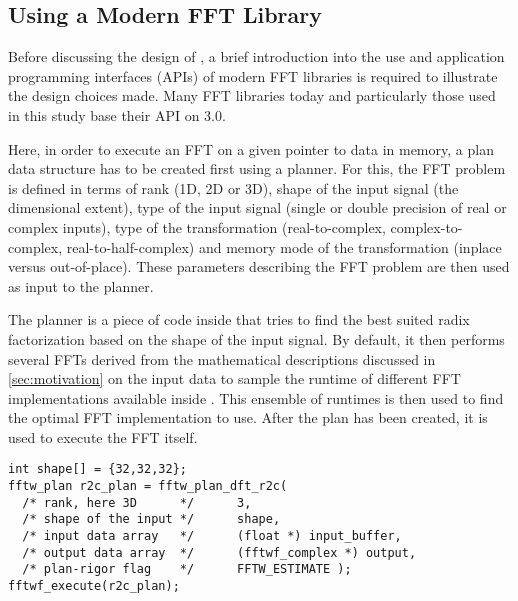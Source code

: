
\subsection{Using a Modern FFT Library}
\label{ssec:modern_ffts}
Before discussing the design of \gearshifft{}, a brief introduction into the use and application programming interfaces (APIs) of modern FFT libraries is required to illustrate the design choices made. Many FFT libraries today and particularly those used in this study base their API on \fftw{} $3.0$. 

Here, in order to execute an FFT on a given pointer to data in memory, a plan data structure has to be created first using a planner. For this, the FFT problem is defined in terms of rank (1D, 2D or 3D), shape of the input signal (the dimensional extent), type of the input signal (single or double precision of real or complex inputs), type of the transformation (real-to-complex, complex-to-complex, real-to-half-complex) and memory mode of the transformation (inplace versus out-of-place). These parameters describing the FFT problem are then used as input to the planner. 

The planner is a piece of code inside \fftw{} that tries to find the best suited radix factorization based on the shape of the input signal. By default, it then performs several FFTs derived from the mathematical descriptions discussed in \cref{sec:motivation} on the input data to sample the runtime of different FFT implementations available inside \fftw{}. This ensemble of runtimes is then used to find the optimal FFT implementation to use. After the plan has been created, it is used to execute the FFT itself.

\begin{lstlisting}[caption={Minimal usage example of the \fftw{} single precision real-to-complex planner API. Memory management is omitted.},label={lst:fftw_example}]
int shape[] = {32,32,32};
fftw_plan r2c_plan = fftw_plan_dft_r2c(
  /* rank, here 3D      */		3,                       
  /* shape of the input */		shape,                   
  /* input data array   */		(float *) input_buffer,  
  /* output data array  */		(fftwf_complex *) output,
  /* plan-rigor flag    */		FFTW_ESTIMATE );         
fftwf_execute(r2c_plan);
\end{lstlisting}

